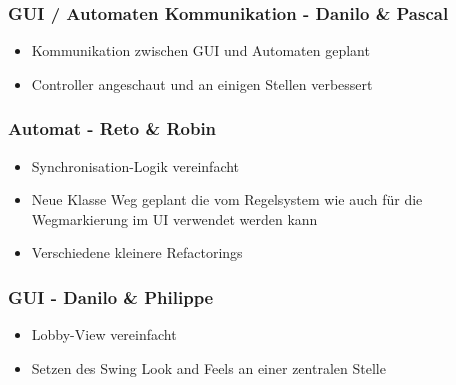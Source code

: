 \documentclass[12pt,halfparskip]{scrartcl}
\begin{document}

\subsubsection{GUI / Automaten Kommunikation - Danilo \& Pascal}
\label{ssub:gui_automaten_kommunikation_danilo_amp_pascal}

\begin{itemize}
	\item Kommunikation zwischen GUI und Automaten geplant
	\item Controller angeschaut und an einigen Stellen verbessert
\end{itemize}


\subsubsection{Automat - Reto \& Robin}
\label{ssub:automat_reto_amp_robin}

\begin{itemize}
	\item Synchronisation-Logik vereinfacht
	\item Neue Klasse Weg geplant die vom Regelsystem wie auch für die Wegmarkierung im UI verwendet werden kann
	\item Verschiedene kleinere Refactorings
\end{itemize}


\subsubsection{GUI - Danilo \& Philippe}
\label{ssub:gui_danilo_amp_philippe}

\begin{itemize}
	\item Lobby-View vereinfacht
	\item Setzen des Swing Look and Feels an einer zentralen Stelle
\end{itemize}
\end{document}
